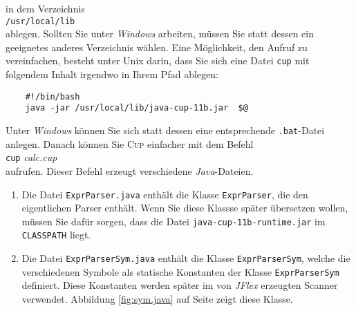in dem Verzeichnis 
\\[0.2cm]
\hspace*{1.3cm}
\texttt{/usr/local/lib}
\\[0.2cm]
ablegen.  Sollten Sie unter \textsl{Windows} arbeiten, m\"ussen Sie statt dessen ein geeignetes anderes
Verzeichnis w\"ahlen.  Eine M\"oglichkeit, den Aufruf zu vereinfachen, besteht unter Unix darin, dass Sie sich
eine Datei \texttt{cup} mit folgendem Inhalt irgendwo in Ihrem Pfad ablegen:
\begin{verbatim}
    #!/bin/bash 
    java -jar /usr/local/lib/java-cup-11b.jar  $@
\end{verbatim} %
Unter \textsl{Windows} k\"onnen Sie sich statt dessen eine entsprechende \texttt{.bat}-Datei anlegen.
Danach k\"onnen Sie \textsc{Cup} einfacher mit dem Befehl
\\[0.2cm]
\hspace*{1.3cm}
\texttt{cup} \textsl{calc.cup}
\\[0.2cm]
aufrufen.  Dieser Befehl erzeugt verschiedene \textsl{Java}-Dateien.
\begin{enumerate}
\item Die Datei \texttt{ExprParser.java} enth\"alt die Klasse \texttt{ExprParser}, die den eigentlichen
      Parser enth\"alt.  Wenn Sie diese Klassse sp\"ater \"ubersetzen wollen, m\"ussen Sie daf\"ur
      sorgen, dass die Datei \texttt{java-cup-11b-runtime.jar} im \texttt{CLASSPATH} liegt.
\item Die Datei \texttt{ExprParserSym.java} enth\"alt die Klasse \texttt{ExprParserSym}, welche die verschiedenen
      Symbole als statische Konstanten  der  Klasse \texttt{ExprParserSym} definiert.  
      Diese Konstanten werden sp\"ater im von \textsl{JFlex} erzeugten Scanner verwendet. Abbildung
      \ref{fig:sym.java} auf Seite \pageref{fig:sym.java} zeigt diese Klasse.
\end{enumerate}

